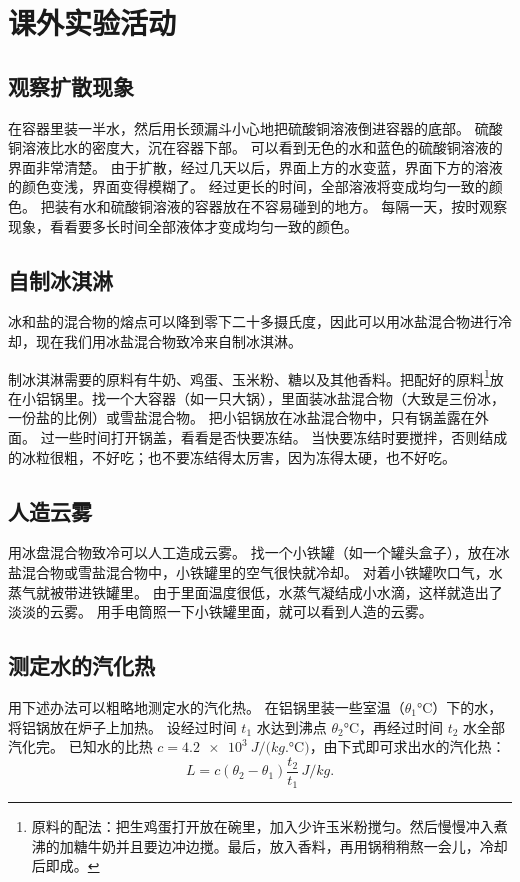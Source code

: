 \chapter*{课外实验活动}
\setcounter{section}{0}
\section{观察扩散现象}
在容器里装一半水，然后用长颈漏斗小心地把硫酸铜溶液倒进容器的底部。
硫酸铜溶液比水的密度大，沉在容器下部。
可以看到无色的水和蓝色的硫酸铜溶液的界面非常清楚。
由于扩散，经过几天以后，界面上方的水变蓝，界面下方的溶液的颜色变浅，界面变得模糊了。
经过更长的时间，全部溶液将变成均匀一致的颜色。
把装有水和硫酸铜溶液的容器放在不容易碰到的地方。
每隔一天，按时观察现象，看看要多长时间全部液体才变成均匀一致的颜色。

\section{自制冰淇淋}
冰和盐的混合物的熔点可以降到零下二十多摄氏度，因此可以用冰盐混合物进行冷却，现在我们用冰盐混合物致冷来自制冰淇淋。

制冰淇淋需要的原料有牛奶、鸡蛋、玉米粉、糖以及其他香料。把配好的原料\footnote{原料的配法：把生鸡蛋打开放在碗里，加入少许玉米粉搅匀。然后慢慢冲入煮沸的加糖牛奶并且要边冲边搅。最后，放入香料，再用锅稍稍熬一会儿，冷却后即成。}放在小铝锅里。找一个大容器（如一只大锅），里面装冰盐混合物（大致是三份冰，一份盐的比例）或雪盐混合物。
把小铝锅放在冰盐混合物中，只有锅盖露在外面。
过一些时间打开锅盖，看看是否快要冻结。
当快要冻结时要搅拌，否则结成的冰粒很粗，不好吃；也不要冻结得太厉害，因为冻得太硬，也不好吃。

\section{人造云雾}
用冰盘混合物致冷可以人工造成云雾。
找一个小铁罐（如一个罐头盒子），放在冰盐混合物或雪盐混合物中，小铁罐里的空气很快就冷却。
对着小铁罐吹口气，水蒸气就被带进铁罐里。
由于里面温度很低，水蒸气凝结成小水滴，这样就造出了淡淡的云雾。
用手电筒照一下小铁罐里面，就可以看到人造的云雾。

\section{测定水的汽化热}
用下述办法可以粗略地测定水的汽化热。
在铝锅里装一些室温（$\theta_1\unit{\celsius}$）下的水，将铝锅放在炉子上加热。
设经过时间 $t_1$ 水达到沸点 $\theta_2\unit{\celsius}$，再经过时间 $t_2$ 水全部汽化完。
已知水的比热 $c=\qty{4.2e3}{J/(kg.\celsius)}$，由下式即可求出水的汽化热：
\[L=c(\theta_2-\theta_1)\frac{t_2}{t_1} \,\unit{J/kg}.\]

